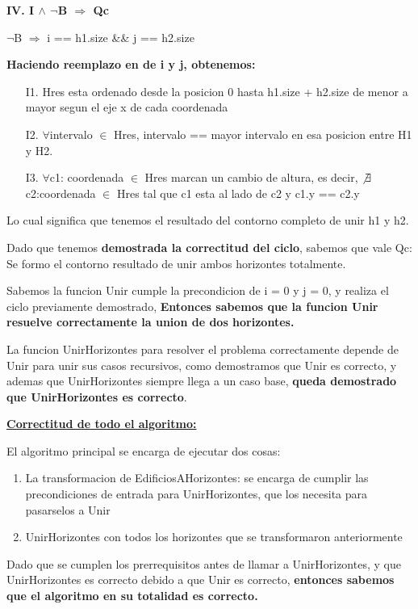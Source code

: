 \noindent \textbf{IV. I $\wedge$ $\neg$B $\Rightarrow$ Qc }

$\neg$B $\Rightarrow$ i == h1.size \&\& j == h2.size

\textbf{Haciendo reemplazo en de i y j, obtenemos:}

\begin{itemize}
\item[I1.] Hres esta ordenado desde la posicion 0 hasta h1.size + h2.size de menor a mayor segun el eje x de cada coordenada
\item[I2.]  $\forall$intervalo $\in$ Hres, intervalo == mayor intervalo en esa posicion entre H1 y H2.
\item[I3.]  $\forall$c1: coordenada $\in$ Hres marcan un cambio de altura, es decir, $\not\exists$ c2:coordenada $\in$ Hres tal que c1 esta al lado de c2 y c1.y == c2.y
\end{itemize}

Lo cual significa que tenemos el resultado del contorno completo de unir h1 y h2.\nopagebreak

\bigskip
Dado que tenemos \textbf{demostrada la correctitud del ciclo}, sabemos que vale Qc: Se formo el contorno resultado de unir ambos horizontes totalmente. 

Sabemos la funcion Unir cumple la precondicion de i = 0 y j = 0, y realiza el ciclo previamente demostrado, \textbf{Entonces sabemos que la funcion Unir resuelve correctamente la union de dos horizontes.}

La funcion UnirHorizontes para resolver el problema correctamente depende de Unir para unir sus casos recursivos, como demostramos que Unir es correcto, y ademas que UnirHorizontes siempre llega a un caso base, \textbf{queda demostrado que UnirHorizontes es correcto}.
\bigskip

\noindent \underline{\textbf{Correctitud de todo el algoritmo:}}

El algoritmo principal se encarga de ejecutar dos cosas:
\begin{enumerate}
\item La transformacion de EdificiosAHorizontes: se encarga de cumplir las precondiciones de entrada para UnirHorizontes, que los necesita para pasarselos a Unir
\item UnirHorizontes con todos los horizontes que se transformaron anteriormente
\end{enumerate}

Dado que se cumplen los prerrequisitos antes de llamar a UnirHorizontes, y que UnirHorizontes es correcto debido a que Unir es correcto, \textbf{entonces sabemos que el algoritmo en su totalidad es correcto.}

